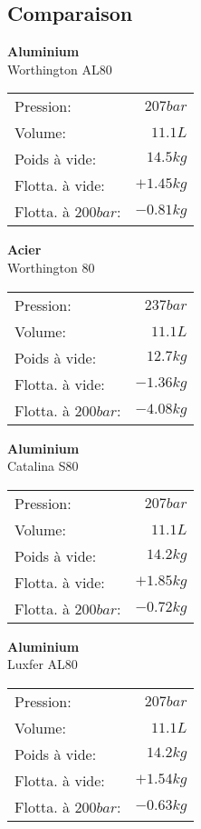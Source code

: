 \documentclass[aspectratio=1610,english,12pt]{beamer}
\begin{document}
\subsection{Comparaison}
\begin{frame}{\insertsubsection}
	\footnotesize
	\begin{multicols}{2}
		\textbf{Aluminium}\\
		Worthington AL80\\
		\begin{tabularx}{\linewidth}{X r}
			Pression:		& 	$207 bar$	\\
			Volume:			&	$11.1L$		\\
			Poids à vide:	&	$14.5kg$	\\
			Flotta.	à vide:	&	$+1.45kg$	\\
			Flotta. à $200bar$:	&	$-0.81kg$
		\end{tabularx}

		\textbf{Acier}\\
		Worthington 80\\
		\begin{tabularx}{\linewidth}{X r}
			Pression:		& 	$237 bar$	\\
			Volume:			&	$11.1L$		\\
			Poids à vide:	&	$12.7kg$	\\
			Flotta. à vide:	&	$-1.36kg$	\\
			Flotta. à $200bar$:	&	$-4.08kg$
		\end{tabularx}
	\end{multicols}

	\vspace{1em}

	\begin{multicols}{2}
		\textbf{Aluminium}\\
		Catalina S80\\
		\begin{tabularx}{\linewidth}{X r}
			Pression:		& 	$207 bar$	\\
			Volume:			&	$11.1L$		\\
			Poids à vide:	&	$14.2kg$	\\
			Flotta.	à vide:	&	$+1.85kg$	\\
			Flotta. à $200bar$:	&	$-0.72kg$
		\end{tabularx}

		\textbf{Aluminium}\\
		Luxfer AL80\\
		\begin{tabularx}{\linewidth}{X r}
			Pression:		& 	$207 bar$	\\
			Volume:			&	$11.1L$		\\
			Poids à vide:	&	$14.2kg$	\\
			Flotta. à vide:	&	$+1.54kg$	\\
			Flotta. à $200bar$:	&	$-0.63kg$
		\end{tabularx}
	\end{multicols}
\end{frame}
\end{document}
